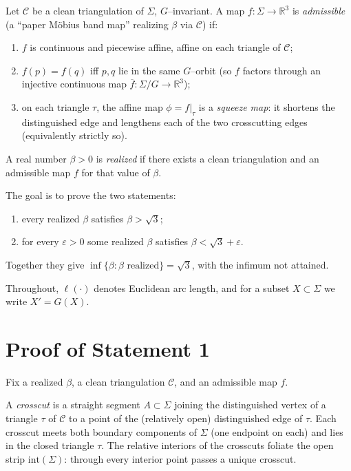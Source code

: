 \begin{definition}
Let $\mathcal{C}$ be a clean triangulation of $\Sigma$, $G$--invariant.
A map $f\colon\Sigma\to\mathbb{R}^3$ is \emph{admissible} (a ``paper Möbius band map''
realizing $\beta$ via $\mathcal{C}$) if:
\begin{enumerate}
\item[(i)] $f$ is continuous and piecewise affine, affine on each triangle of
$\mathcal{C}$;
\item[(ii)] $f(p)=f(q)$ iff $p,q$ lie in the same $G$--orbit (so $f$ factors through
an injective continuous map $\overline f\colon\Sigma/G\to\mathbb{R}^3$);
\item[(iii)] on each triangle $\tau$, the affine map $\phi=f|_\tau$ is a
\emph{squeeze map}: it shortens the distinguished edge and lengthens each of the
two crosscutting edges (equivalently strictly so).
\end{enumerate}
A real number $\beta>0$ is \emph{realized} if there exists a clean triangulation and
an admissible map $f$ for that value of $\beta$.
\end{definition}

The goal is to prove the two statements:
\begin{enumerate}
\item every realized $\beta$ satisfies $\beta>\sqrt3$;
\item for every $\varepsilon>0$ some realized $\beta$ satisfies $\beta<\sqrt3+\varepsilon$.
\end{enumerate}
Together they give $\inf\{\beta:\beta\text{ realized}\}=\sqrt3$, with the infimum not
attained.

Throughout, $\ell(\cdot)$ denotes Euclidean arc length, and for a subset
$X\subset\Sigma$ we write $X'=G(X)$.

\section{Proof of Statement 1}

Fix a realized $\beta$, a clean triangulation $\mathcal{C}$, and an admissible map $f$.

\begin{definition}
A \emph{crosscut} is a straight segment $A\subset\Sigma$ joining the distinguished
vertex of a triangle $\tau$ of $\mathcal{C}$ to a point of the (relatively open)
distinguished edge of $\tau$. Each crosscut meets both boundary components of
$\Sigma$ (one endpoint on each) and lies in the closed triangle $\tau$.
The relative interiors of the crosscuts foliate the open strip
$\mathrm{int}(\Sigma)$: through every interior point passes a unique crosscut.
\end{definition}

